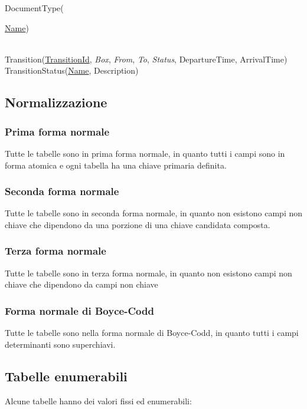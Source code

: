 DocumentType({\underline{Name})

\noindent \\
Transition(\underline{TransitionId}, \textit{Box}, \textit{From}, \textit{To}, \textit{Status}, DepartureTime, ArrivalTime) \\
TransitionStatus(\underline{Name}, Description)

\subsection{Normalizzazione}

\subsubsection{Prima forma normale}

Tutte le tabelle sono in prima forma normale, in quanto tutti i campi sono in forma atomica e ogni tabella ha una chiave primaria definita.

\subsubsection{Seconda forma normale}

Tutte le tabelle sono in seconda forma normale, in quanto non esistono campi non chiave che dipendono da una porzione di una chiave candidata composta.

\subsubsection{Terza forma normale}

Tutte le tabelle sono in terza forma normale, in quanto non esistono campi non chiave che dipendono da campi non chiave

\subsubsection{Forma normale di Boyce-Codd}

Tutte le tabelle sono nella forma normale di Boyce-Codd, in quanto tutti i campi determinanti sono superchiavi.

\subsection{Tabelle enumerabili}

Alcune tabelle hanno dei valori fissi ed enumerabili:

}
